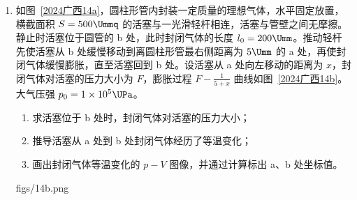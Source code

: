 \documentclass[\gkver]{gaokaozhenti}
\begin{document}
\begin{enumerate}
{\begin{enumerate}
\end{enumerate}
}

\item
如图~\ref{2024广西14a}，圆柱形管内封装一定质量的理想气体，水平固定放置，横截面积 $S = 500 \Ummq$ 的活塞与一光滑轻杆相连，活塞与管壁之间无摩擦。静止时活塞位于圆管的 b 处，此时封闭气体的长度 $l_{0} = 200 \Umm$。推动轻杆先使活塞从 b 处缓慢移动到离圆柱形管最右侧距离为 $5 \Umm$ 的 a 处，再使封闭气体缓慢膨胀，直至活塞回到 b 处。设活塞从 a 处向左移动的距离为 $x$，封闭气体对活塞的压力大小为 $F$，膨胀过程 $F - \frac{1}{5 + x}$ 曲线如图~\ref{2024广西14b}。大气压强 $p_{0} = 1 \times 10^{5} \UPa$。
\begin{enumerate}
	\item
	求活塞位于 b 处时，封闭气体对活塞的压力大小；
	\item
	推导活塞从 a 处到 b 处封闭气体经历了等温变化；
	\item
	画出封闭气体等温变化的 $p - V$ 图像，并通过计算标出 a、b 处坐标值。
\end{enumerate}
{figs/14b.png}

\jdanswer{
\begin{enumerate}
	\item
	$50 \UN$


\end{enumerate}}
\end{enumerate}
\end{document}
